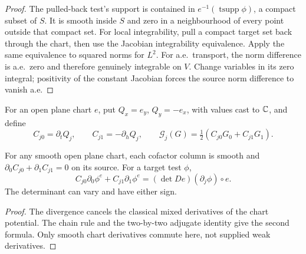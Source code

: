 \begin{proof}
\leanok
The pulled-back test's support is contained in
$e^{-1}(\operatorname{tsupp}\phi)$, a compact subset of $S$.
It is smooth inside $S$ and zero in a neighbourhood of every point
outside that compact set.
For local integrability, pull a compact target set back through the chart,
then use the Jacobian integrability equivalence. Apply the same equivalence
to squared norms for $L^2$.
For a.e.\ transport, the norm difference is a.e.\ zero and therefore genuinely
integrable on $V$. Change variables in its zero integral; positivity of the
constant Jacobian forces the source norm difference to vanish a.e.
\end{proof}

\begin{definition}
\label{def:smooth-chart-cofactor}
For an open plane chart $e$, put $Q_x=e_y$, $Q_y=-e_x$, with values
cast to $\mathbb{C}$, and define
\[
 C_{j0}=\partial_tQ_j,\qquad C_{j1}=-\partial_hQ_j,\qquad
 \mathcal G_j(G)=\tfrac12(C_{j0}G_0+C_{j1}G_1).
\]
\leanok
\end{definition}

\begin{lemma}
\label{lem:smooth-chart-cofactor-calculus}
\leanok
For any smooth open plane chart, each cofactor column is smooth and
$\partial_0C_{j0}+\partial_1C_{j1}=0$ on its source.
For a target test $\phi$,
\[
 C_{j0}\partial_0\phi^e+C_{j1}\partial_1\phi^e
   =(\det De)(\partial_j\phi)\circ e.
\]
The determinant can vary and have either sign.
\end{lemma}

\begin{proof}
\leanok
The divergence cancels the classical mixed derivatives of the chart potential.
The chain rule and the two-by-two adjugate identity give the second formula.
Only smooth chart derivatives commute here, not supplied weak derivatives.
\end{proof}

